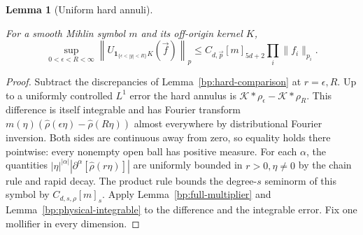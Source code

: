 \documentclass[11pt,letterpaper]{article}
\newtheorem{lemma}[theorem]{Lemma}
\theoremstyle{definition}
\newcommand{\ind}{\mathbf1}
\providecommand{\lean}[1]{}
\providecommand{\uses}[1]{}
\begin{document}
\begin{lemma}[Uniform hard annuli]\label{bp:hard-general}
\lean{TwistedParaproduct.hardGeneral}
For a smooth Mihlin symbol \(m\) and its off-origin kernel \(K\),
\[
 \sup_{0<\epsilon<R<\infty}
 \left\|U_{\ind_{\{\epsilon<|y|<R\}}K}(\vec f)\right\|_p
 \le C_{d,\vec p}[m]_{5d+2}\prod_i\|f_i\|_{p_i}.
\]
\end{lemma}
\begin{proof}
\uses{bp:hard-comparison,bp:full-multiplier,bp:physical-integrable}
Subtract the discrepancies of Lemma~\ref{bp:hard-comparison} at
\(r=\epsilon,R\). Up to a uniformly controlled \(L^1\) error the
hard annulus is \(\mathcal K*\rho_\epsilon-\mathcal K*\rho_R\).
This difference is itself integrable and has Fourier transform
\(m(\eta)(\widehat\rho(\epsilon\eta)-\widehat\rho(R\eta))\)
almost everywhere by distributional Fourier inversion. Both sides
are continuous away from zero, so equality holds there pointwise:
every nonempty open ball has positive measure. For each
\(\alpha\), the quantities \(|\eta|^{|\alpha|}
|\partial^\alpha[\widehat\rho(r\eta)]|\) are uniformly bounded in
\(r>0,\eta\ne0\) by the chain rule and rapid decay. The product rule
bounds the degree-\(s\) seminorm of this symbol by
\(C_{d,s,\rho}[m]_s\). Apply Lemma~\ref{bp:full-multiplier} and
Lemma~\ref{bp:physical-integrable} to the difference and the
integrable error. Fix one mollifier in every dimension.
\end{proof}
\end{document}
